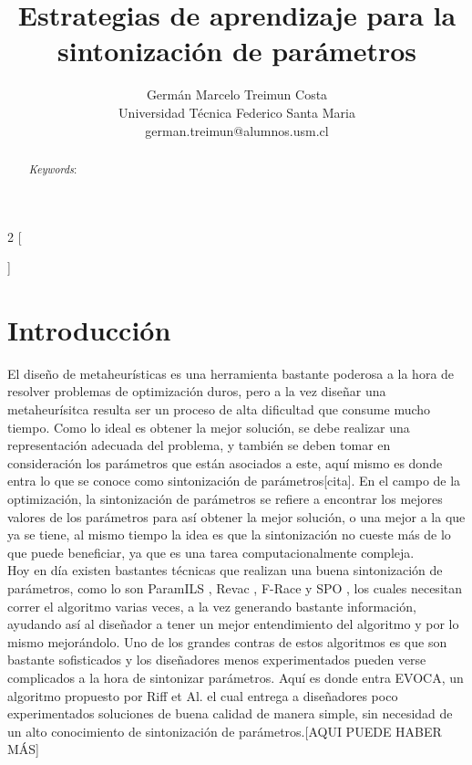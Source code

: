 \documentclass[letter, 10pt]{article}
\begin{document}
\begin{multicols}{2}
[
\title{Estrategias de aprendizaje para la sintonización de parámetros}
\author{Germán Marcelo Treimun Costa \\ \small{Universidad Técnica Federico Santa Maria} \\ \small{german.treimun@alumnos.usm.cl}}
\date{\none}
\maketitle
]

\begin{abstract}

\textit{Keywords}: 
\end{abstract}

\section{Introducci\'on}
El diseño de metaheurísticas es una herramienta bastante poderosa a la hora de resolver problemas de optimización duros, pero a la vez diseñar una metaheurísitca resulta ser un proceso de alta dificultad que consume mucho tiempo. Como lo ideal es obtener la mejor solución, se debe realizar una representación adecuada del problema, y  también se deben tomar en consideración los parámetros que están asociados a este, aquí mismo es donde entra lo que se conoce como sintonización de parámetros[cita]. En el campo de la optimización, la sintonización de parámetros se refiere a encontrar los mejores valores de los parámetros para así obtener la mejor solución, o una mejor a la que ya se tiene, al mismo tiempo la idea es que la sintonización no cueste más de lo que puede beneficiar, ya que es una tarea computacionalmente compleja.\\

Hoy en día existen bastantes técnicas que realizan una buena sintonización de parámetros, como lo son ParamILS \cite{Hutter2007AutomaticAC}, Revac \cite{Nannen2007RelevanceEA}, F-Race \cite{Birattari2002ARA} y SPO \cite{BartzBeielstein2005SequentialPO}, los cuales necesitan correr el algoritmo varias veces, a la vez generando bastante información, ayudando así al diseñador a tener un mejor entendimiento del algoritmo y por lo mismo mejorándolo. Uno de los grandes contras de estos algoritmos es que son bastante sofisticados y los diseñadores menos experimentados pueden verse complicados  a la hora de sintonizar parámetros. Aquí es donde entra EVOCA, un algoritmo propuesto por Riff et Al. \cite{Riff2013ANA} el cual entrega a diseñadores poco experimentados soluciones de buena calidad  de manera simple, sin necesidad de un alto conocimiento de sintonización de parámetros.[AQUI PUEDE HABER MÁS]\\


\end{multicols}
\end{document}
